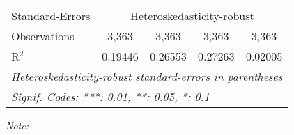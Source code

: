 \begin{table}[htbp!]
\begin{adjustbox}{width = 1\textwidth, max height = 0.95\textheight, center}
\begin{threeparttable}[b]
\begin{tabular}{lcccc}
            \midrule 
            Standard-Errors & \multicolumn{4}{c}{Heteroskedasticity-robust} \\ 
            Observations         & 3,363                          & 3,363                          & 3,363                           & 3,363\\  
            R$^2$                & 0.19446                        & 0.26553                        & 0.27263                         & 0.02005\\  
            \midrule \midrule
            \multicolumn{5}{l}{\emph{Heteroskedasticity-robust standard-errors in parentheses}}\\
            \multicolumn{5}{l}{\emph{Signif. Codes: ***: 0.01, **: 0.05, *: 0.1}}\\
         \end{tabular}
         
         \begin{tablenotes}\item \medskip \textit{Note:}
         \end{tablenotes}
      \end{threeparttable}
   \end{adjustbox}
\end{table}


